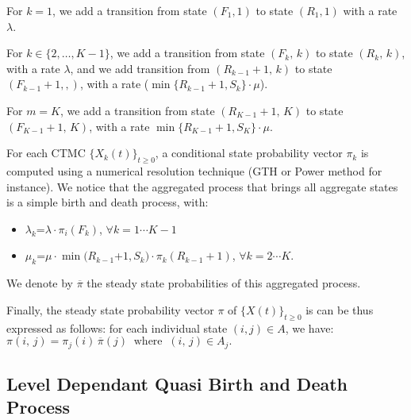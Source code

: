 \documentclass[conference]{IEEEtran}
\begin{document}
For $k=1$,  we add a transition from state $(F_{1},1)$ to state $(R_{1},1)$ with a rate $\lambda$.

For $k \in \{2,\ldots,K-1\}$,  we add a transition from state $(F_{k},\,k)$ to state $(R_{k},\,k)$,
with a rate $\lambda$, and we add transition from $(R_{k-1}+1,\,k)$ to state $(F_{k-1}+1,,)$, with a rate ($\min\{R_{k-1}+1,S_k\} \cdot \mu$).

For $m=K$, we add a transition from state $(R_{K-1}+1,\, K)$ to state $(F_{K-1}+1,\,K)$, with a rate $\min\{R_{K-1}+1,S_K\} \cdot \mu$.

For each CTMC $\{X_{k}(t)\}_{t \geq 0}$, a conditional state probability vector $\pi_k$ is computed using a numerical resolution technique \cite{Stew95} (GTH or Power method for instance).
 We notice that the aggregated process that brings all aggregate states is a simple birth and death process, with:
\begin{itemize} %
\item $\lambda_{k}$=$\lambda \cdot \pi_{i}(F_{k})$,\;\; $\forall k=1\cdots K-1$
\item $\mu_{k}$=$ \mu \cdot \min(R_{k-1}$+$1,S_k) \cdot \pi_{k}(R_{k-1} + \!1)$,\; $\forall k=2\cdots K$.
\end{itemize}
We denote by $\overline{\pi}$ the steady state probabilities of this aggregated process.

Finally, the steady state probability vector $\pi$ of $\{X(t)\}_{t \geq 0}$ is can be thus expressed as follows:
for each individual state $(i,j)\in A$,  we have:
\(
\pi(i,\,j)=\pi_j(i)\,\overline{\pi}(j)\;\; \mbox{where} \;\; (i,\,j)\in A_j.
\)




\subsection{Level Dependant Quasi Birth and Death Process}
\end{document}
